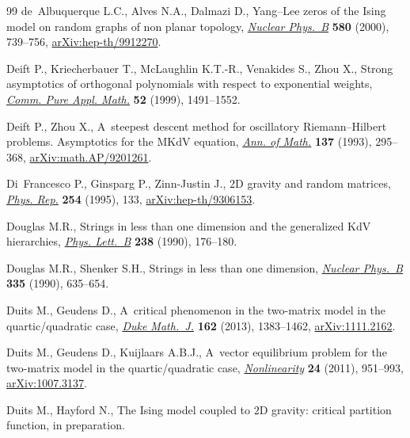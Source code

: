 \documentclass[pdftex]{sigma}
\numberwithin{equation}{section}
\begin{document}
\begin{thebibliography}{99}
de~Albuquerque L.C., Alves N.A., Dalmazi D., Yang--{L}ee zeros of the {I}sing
 model on random graphs of non planar topology,
 \href{https://doi.org/10.1016/S0550-3213(00)00290-X}{\textit{Nuclear
 Phys.~B}} \textbf{580} (2000), 739--756,
 \href{http://arxiv.org/abs/hep-th/9912270}{arXiv:hep-th/9912270}.

Deift P., Kriecherbauer T., McLaughlin K.T.-R., Venakides S., Zhou X., Strong
 asymptotics of orthogonal polynomials with respect to exponential weights,
 \href{https://doi.org/10.1002/(SICI)1097-0312(199912)52:12%3C1491::AID-CPA2%3E3.0.CO;2-%23}{\textit{Comm.
 Pure Appl. Math.}} \textbf{52} (1999), 1491--1552.

Deift P., Zhou X., A~steepest descent method for oscillatory
 {R}iemann--{H}ilbert problems. {A}symptotics for the {MK}d{V} equation,
 \href{https://doi.org/10.2307/2946540}{\textit{Ann. of Math.}} \textbf{137}
 (1993), 295--368,
 \href{http://arxiv.org/abs/math.AP/9201261}{arXiv:math.AP/9201261}.

Di~Francesco P., Ginsparg P., Zinn-Justin J., {$2$}{D} gravity and random
 matrices, \href{https://doi.org/10.1016/0370-1573(94)00084-G}{\textit{Phys.
 Rep.}} \textbf{254} (1995), 133,
 \href{http://arxiv.org/abs/hep-th/9306153}{arXiv:hep-th/9306153}.

Douglas M.R., Strings in less than one dimension and the generalized {K}d{V}
 hierarchies,
 \href{https://doi.org/10.1016/0370-2693(90)91716-O}{\textit{Phys. Lett.~B}}
 \textbf{238} (1990), 176--180.

Douglas M.R., Shenker S.H., Strings in less than one dimension,
 \href{https://doi.org/10.1016/0550-3213(90)90522-F}{\textit{Nuclear Phys.~B}}
 \textbf{335} (1990), 635--654.

Duits M., Geudens D., A~critical phenomenon in the two-matrix model in the
 quartic/quadratic case,
 \href{https://doi.org/10.1215/00127094-2208757}{\textit{Duke Math.~J.}}
 \textbf{162} (2013), 1383--1462,
 \href{http://arxiv.org/abs/1111.2162}{arXiv:1111.2162}.

Duits M., Geudens D., Kuijlaars A.B.J., A~vector equilibrium problem for the
 two-matrix model in the quartic/quadratic case,
 \href{https://doi.org/10.1088/0951-7715/24/3/012}{\textit{Nonlinearity}}
 \textbf{24} (2011), 951--993,
 \href{http://arxiv.org/abs/1007.3137}{arXiv:1007.3137}.

Duits M., Hayford N., The {I}sing model coupled to {$2$}{D} gravity: critical
 partition function, {i}n preparation.


\end{thebibliography}
\end{document}
